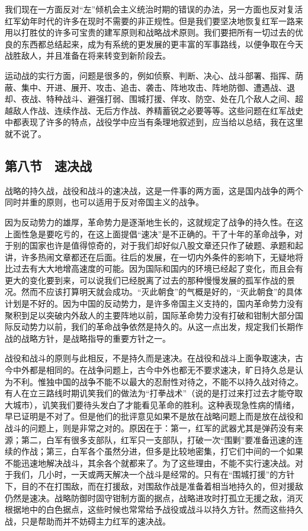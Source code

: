 我们现在一方面反对“左”倾机会主义统治时期的错误的办法，另一方面也反对复活红军幼年时代的许多在现时不需要的非正规性。但是我们要坚决地恢复红军一路来用以打胜仗的许多可宝贵的建军原则和战略战术原则。我们要把所有一切过去的优良的东西都总结起来，成为有系统的更发展的更丰富的军事路线，以便争取在今天战胜敌人，并且准备在将来转变到新阶段去。

运动战的实行方面，问题是很多的，例如侦察、判断、决心、战斗部署、指挥、荫蔽、集中、开进、展开、攻击、追击、袭击、阵地攻击、阵地防御、遭遇战、退却、夜战、特种战斗、避强打弱、围城打援、佯攻、防空、处在几个敌人之间、超越敌人作战、连续作战、无后方作战、养精蓄锐之必要等等。这些问题在红军战史中都表现了许多的特点，战役学中应当有条理地叙述到，应当给以总结，我在这里就不说了。

\subsection{第八节　速决战}

战略的持久战，战役和战斗的速决战，这是一件事的两方面，这是国内战争的两个同时并重的原则，也可以适用于反对帝国主义的战争。

因为反动势力的雄厚，革命势力是逐渐地生长的，这就规定了战争的持久性。在这上面性急是要吃亏的，在这上面提倡“速决”是不正确的。干了十年的革命战争，对于别的国家也许是值得惊奇的，对于我们却好似八股文章还只作了破题、承题和起讲，许多热闹文章都还在后面。往后的发展，在一切内外条件的影响下，无疑地将比过去有大大地增高速度的可能。因为国际和国内的环境已经起了变化，而且会有更大的变化要到来，可以说我们已经脱离了过去的那种慢慢发展的孤军作战的景况。然而不应该打算明天就会成功。“灭此朝食”的气概是好的，“灭此朝食”的具体计划是不好的。因为中国的反动势力，是许多帝国主义支持的，国内革命势力没有聚积到足以突破内外敌人的主要阵地以前，国际革命势力没有打破和钳制大部分国际反动势力以前，我们的革命战争依然是持久的。从这一点出发，规定我们长期作战的战略方针，是战略指导的重要方针之一。

战役和战斗的原则与此相反，不是持久而是速决。在战役和战斗上面争取速决，古今中外都是相同的。在战争问题上，古今中外也都无不要求速决，旷日持久总是认为不利。惟独中国的战争不能不以最大的忍耐性对待之，不能不以持久战对待之。有人在立三路线时期讥笑我们的做法为“打拳战术”（说的是打过来打过去才能夺取大城市），讥笑我们要待头发白了才能看见革命的胜利。这种表现急性病的情绪，早已证明是不对了。但是他们的批评意见如果不是放在战略问题上而是放在战役和战斗的问题上，则是非常之对的。原因在于：第一，红军的武器尤其是弹药没有来源；第二，白军有很多支部队，红军只一支部队，打破一次“围剿”要准备迅速的连续的作战；第三，白军各个虽然分进，但多是比较地密集，打它们中间的一个如果不能迅速地解决战斗，其余各个就都来了。为了这些理由，不能不实行速决战。对于我们，几小时，一天或两天解决一个战斗是经常的。只有在“围城打援”的方针下，目的不在打围敌，而在打援敌，对围敌作战是准备着相当地持久的，但对援敌仍然是速决。战略防御时固守钳制方面的据点，战略进攻时打孤立无援之敌，消灭根据地中的白色据点，这些时候也常常给予战役或战斗以持久方针。然而这些持久战，只是帮助而并不妨碍主力红军的速决战。

